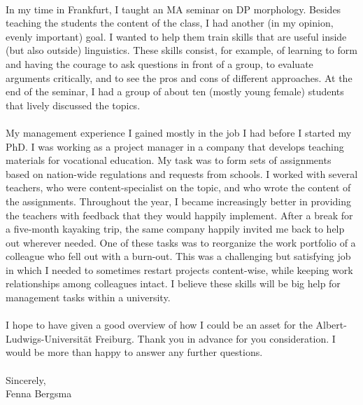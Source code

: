\documentclass[12pt]{article}
\begin{document}
\phantom{x}\\

In my time in Frankfurt, I taught an MA seminar on DP morphology. Besides teaching the students the content of the class, I had another (in my opinion, evenly important) goal. I wanted to help them train skills that are useful inside (but also outside) linguistics. These skills consist, for example, of learning to form and having the courage to ask questions in front of a group, to evaluate arguments critically, and to see the pros and cons of different approaches. At the end of the seminar, I had a group of about ten (mostly young female) students that lively discussed the topics.
\\

\phantom{x}\\

My management experience I gained mostly in the job I had before I started my PhD. I was working as a project manager in a company that develops teaching materials for vocational education. My task was to form sets of assignments based on nation-wide regulations and requests from schools. I worked with several teachers, who were content-specialist on the topic, and who wrote the content of the assignments. Throughout the year, I became increasingly better in providing the teachers with feedback that they would happily implement. After a break for a five-month kayaking trip, the same company happily invited me back to help out wherever needed. One of these tasks was to reorganize the work portfolio of a colleague who fell out with a burn-out. This was a challenging but satisfying job in which I needed to sometimes restart projects content-wise, while keeping work relationships among colleagues intact. I believe these skills will be big help for management tasks within a university.\\

\phantom{x}\\

I hope to have given a good overview of how I could be an asset for the Albert-Ludwigs-Universität Freiburg. Thank you in advance for you consideration. I would be more than happy to answer any further questions.\\

\phantom{x}\\



Sincerely,\\
Fenna Bergsma
\end{document}
